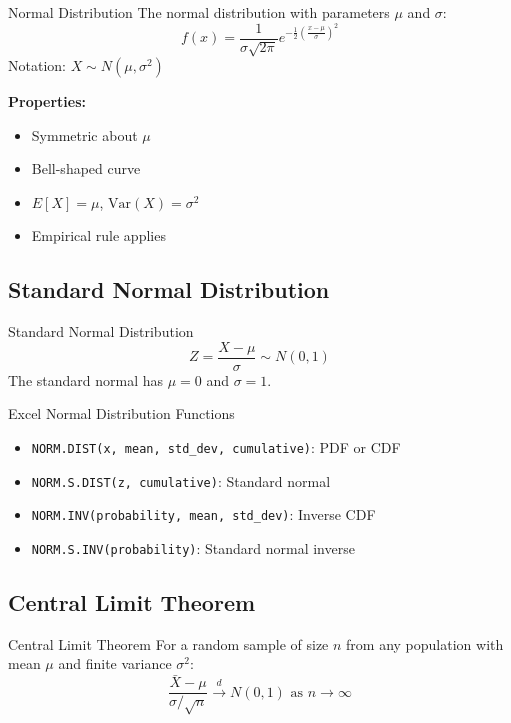 \documentclass[12pt,a4paper]{book}
\begin{document}
\begin{definition}{Normal Distribution}
The normal distribution with parameters $\mu$ and $\sigma$:
\[
f(x) = \frac{1}{\sigma\sqrt{2\pi}} e^{-\frac{1}{2}\left(\frac{x-\mu}{\sigma}\right)^2}
\]
Notation: $X \sim N(\mu, \sigma^2)$
\end{definition}

\textbf{Properties:}
\begin{itemize}
    \item Symmetric about $\mu$
    \item Bell-shaped curve
    \item $E[X] = \mu$, $\text{Var}(X) = \sigma^2$
    \item Empirical rule applies
\end{itemize}

\subsection{Standard Normal Distribution}

\begin{definition}{Standard Normal Distribution}
\[
Z = \frac{X - \mu}{\sigma} \sim N(0, 1)
\]
The standard normal has $\mu = 0$ and $\sigma = 1$.
\end{definition}

\begin{example}{Excel Normal Distribution Functions}
\begin{itemize}
    \item \texttt{NORM.DIST(x, mean, std\_dev, cumulative)}: PDF or CDF
    \item \texttt{NORM.S.DIST(z, cumulative)}: Standard normal
    \item \texttt{NORM.INV(probability, mean, std\_dev)}: Inverse CDF
    \item \texttt{NORM.S.INV(probability)}: Standard normal inverse
\end{itemize}
\end{example}

\subsection{Central Limit Theorem}

\begin{definition}{Central Limit Theorem}
For a random sample of size $n$ from any population with mean $\mu$ and finite variance $\sigma^2$:
\[
\frac{\bar{X} - \mu}{\sigma/\sqrt{n}} \xrightarrow{d} N(0, 1) \text{ as } n \to \infty
\]
\end{definition}
\end{document}
